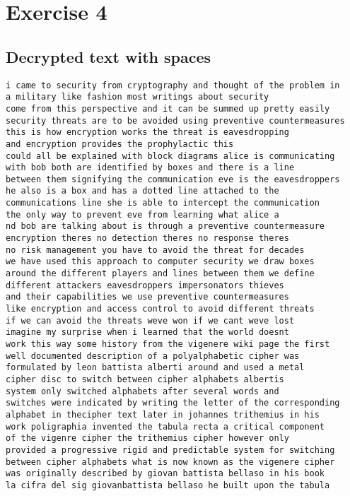 \documentclass[a4paper]{article}
\begin{document}
\section{Exercise 4}

\subsection{Decrypted text with spaces}
\begin{verbatim}
i came to security from cryptography and thought of the problem in 
a military like fashion most writings about security
come from this perspective and it can be summed up pretty easily
security threats are to be avoided using preventive countermeasures
this is how encryption works the threat is eavesdropping
and encryption provides the prophylactic this
could all be explained with block diagrams alice is communicating
with bob both are identified by boxes and there is a line
between them signifying the communication eve is the eavesdroppers
he also is a box and has a dotted line attached to the
communications line she is able to intercept the communication
the only way to prevent eve from learning what alice a
nd bob are talking about is through a preventive countermeasure
encryption theres no detection theres no response theres
no risk management you have to avoid the threat for decades
we have used this approach to computer security we draw boxes
around the different players and lines between them we define
different attackers eavesdroppers impersonators thieves
and their capabilities we use preventive countermeasures
like encryption and access control to avoid different threats
if we can avoid the threats weve won if we cant weve lost
imagine my surprise when i learned that the world doesnt
work this way some history from the vigenere wiki page the first
well documented description of a polyalphabetic cipher was
formulated by leon battista alberti around and used a metal
cipher disc to switch between cipher alphabets albertis
system only switched alphabets after several words and
switches were indicated by writing the letter of the corresponding
alphabet in thecipher text later in johannes trithemius in his
work poligraphia invented the tabula recta a critical component
of the vigenre cipher the trithemius cipher however only
provided a progressive rigid and predictable system for switching
between cipher alphabets what is now known as the vigenere cipher
was originally described by giovan battista bellaso in his book
la cifra del sig giovanbattista bellaso he built upon the tabula 

\end{verbatim}
\end{document}
